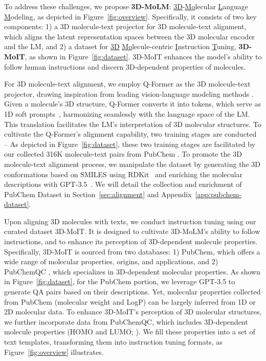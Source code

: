 To address these challenges, we propose \textbf{3D-MoLM}: \underline{3D}-\underline{Mo}lecular \underline{L}anguage \underline{M}odeling, as depicted in Figure~\ref{fig:overview}. Specifically, it consists of two key components: 1) a 3D molecule-text projector for 3D molecule-text alignment, which aligns the latent representation spaces between the 3D molecular encoder and the LM, and 2) a dataset for \underline{3D} \underline{Mo}lecule-centric \underline{I}nstruction \underline{T}uning, \textbf{3D-MoIT}, as shown in Figure~\ref{fig:dataset}. 3D-MoIT enhances the model's ability to follow human instructions and discern 3D-dependent properties of molecules.

For 3D molecule-text alignment, we employ Q-Former \citep{blip2} as the 3D molecule-text projector, drawing inspiration from leading vision-language modeling methods \citep{minigpt4,instructblip}. 
Given a molecule's 3D structure, Q-Former converts it into tokens, which serve as 1D soft prompts~\citep{PrefixTuning}, harmonizing seamlessly with the language space of the LM. 
This translation facilitates the LM's interpretation of 3D molecular structures.   
To cultivate the Q-Former's alignment capability, two training stages are conducted  -- 
As depicted in Figure~\ref{fig:dataset}, these two training stages are facilitated by our collected 316K molecule-text pairs from PubChem \citep{pubchem}. 
To promote the 3D molecule-text alignment process, we manipulate the dataset by generating the 3D conformations based on SMILES using RDKit~\citep{rdkit} and enriching the molecular descriptions with GPT-3.5~\citep{ChatGPT}.
We will detail the collection and enrichment of PubChem Dataset in Section~\ref{sec:alignment} and Appendix~\ref{app:pubchem-dataset}.

Upon aligning 3D molecules with texts, we conduct instruction tuning using our curated dataset 3D-MoIT. 
It is designed to cultivate 3D-MoLM's ability to follow instructions, and to enhance its perception of 3D-dependent molecule properties. 
Specifically, 3D-MoIT is sourced from two databases: 1) PubChem, which offers a wide range of molecular properties, origins, and applications, and 2) PubChemQC \citep{pubchemqc}, which specializes in 3D-dependent molecular properties. 
As shown in Figure~\ref{fig:dataset}, for the PubChem portion, we leverage GPT-3.5 to generate QA pairs based on their descriptions.
Yet, molecular properties collected from PubChem (\eg molecular weight and LogP) can be largely inferred from 1D or 2D molecular data. 
To enhance 3D-MoIT's perception of 3D molecular structures, we further incorporate data from PubChemQC, which includes 3D-dependent molecule properties (\eg HOMO and LUMO; \cite{mcquarrie1997physical}). 
We fill these properties into a set of text templates, transforming them into instruction tuning formats, as Figure~\ref{fig:overview} illustrates.
 
